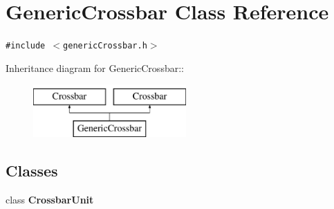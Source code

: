 \hypertarget{classGenericCrossbar}{
\section{GenericCrossbar Class Reference}
\label{classGenericCrossbar}
}
{\tt \#include $<$genericCrossbar.h$>$}

Inheritance diagram for GenericCrossbar::\begin{figure}[H]
\begin{center}
\leavevmode
\includegraphics[height=2cm]{classGenericCrossbar}
\end{center}
\end{figure}
\subsection*{Classes}
\begin{CompactItemize}
\item 
class \textbf{CrossbarUnit}
\end{CompactItemize}

